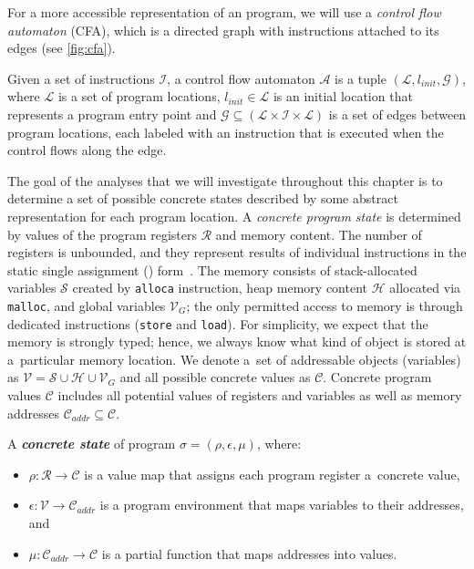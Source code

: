 For a more accessible representation of an \llvm program, we will use a
\emph{control flow automaton} (CFA), which is a directed graph with \llvm
instructions attached to its edges (see \autoref{fig:cfa}).

\begin{definition}
    Given a set of instructions $\mathcal{I}$, a control flow automaton
    $\mathcal{A}$ is a tuple $(\mathcal{L}, l_{\textit{init}}, \mathcal{G})$,
    where $\mathcal{L}$ is a set of program locations, $l_{\textit{init}} \in
    \mathcal{L}$ is an initial location that represents a program entry point
    and $\mathcal{G} \subseteq (\mathcal{L} \times \mathcal{I} \times
    \mathcal{L})$ is a set of edges between program locations, each labeled with
    an instruction that is executed when the control flows along the edge.
\end{definition}

The goal of the analyses that we will investigate throughout this chapter is to
determine a set of possible concrete states described by some abstract
representation for each program location. A \emph{concrete program state} is
determined by values of the program registers $\mathcal{R}$ and memory content.
The number of \llvm registers is unbounded, and they represent results of
individual instructions in the static single assignment (\ssa)
form~\cite{Cytron1991}. The memory consists of stack-allocated variables
$\mathcal{S}$ created by \texttt{alloca} instruction, heap memory content
$\mathcal{H}$ allocated via \texttt{malloc}, and global variables
$\mathcal{V}_{\textit{G}}$; the only permitted access to memory is through
dedicated instructions (\texttt{store} and \texttt{load}).  For simplicity, we
expect that the memory is strongly typed; hence, we always know what kind of
object is stored at a~particular memory location.  We denote a~set of
addressable objects (variables) as $\mathcal{V} = \mathcal{S} \cup \mathcal{H} \cup
\mathcal{V}_{\textit{G}}$ and all possible concrete values as $\mathcal{C}$.
Concrete program values $\mathcal{C}$ includes all potential values of registers
and variables as well as memory addresses $\mathcal{C}_{\textit{addr}}
\subseteq \mathcal{C}$.

\begin{definition}
    A \textbf{\emph{concrete state}} of \llvm program $\sigma = (\rho, \epsilon, \mu)$, where:
\begin{itemize}
    \item $\rho \colon \mathcal{R} \to \mathcal{C}$ is a value map that assigns each program
        register a~concrete value,
    \item $\epsilon \colon \mathcal{V} \to \mathcal{C}_{\textit{addr}}$ is a
        program environment that maps variables to their addresses, and
    \item $\mu \colon \mathcal{C}_{\textit{addr}} \to \mathcal{C}$ is a
        partial function that maps addresses into values.
\end{itemize}
\end{definition}

